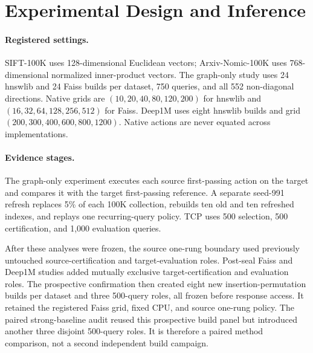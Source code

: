 \section{Experimental Design and Inference}
\label{sec:methodology}

\paragraph{Registered settings.}
SIFT-100K uses 128-dimensional Euclidean vectors; Arxiv-Nomic-100K uses 768-dimensional normalized inner-product vectors. The graph-only study uses 24 hnswlib and 24 Faiss builds per dataset, 750 queries, and all 552 non-diagonal directions. Native grids are $(10,20,40,80,120,200)$ for hnswlib and $(16,32,64,128,256,512)$ for Faiss. Deep1M uses eight hnswlib builds and grid $(200,300,400,600,800,1200)$. Native actions are never equated across implementations.

\paragraph{Evidence stages.}
The graph-only experiment executes each source first-passing action on the target and compares it with the target first-passing reference. A separate seed-991 refresh replaces 5\% of each 100K collection, rebuilds ten old and ten refreshed indexes, and replays one recurring-query policy. TCP uses 500 selection, 500 certification, and 1,000 evaluation queries.

After these analyses were frozen, the source one-rung boundary used previously untouched source-certification and target-evaluation roles. Post-seal Faiss and Deep1M studies added mutually exclusive target-certification and evaluation roles. The prospective confirmation then created eight new insertion-permutation builds per dataset and three 500-query roles, all frozen before response access. It retained the registered Faiss grid, fixed CPU, and source one-rung policy. The paired strong-baseline audit reused this prospective build panel but introduced another three disjoint 500-query roles. It is therefore a paired method comparison, not a second independent build campaign.

